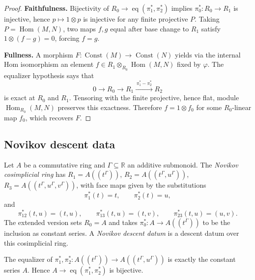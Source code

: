 \begin{proof}
  \leanok
  \textbf{Faithfulness.}  Bijectivity of $R_0 \to \operatorname{eq}(\pi_1^\ast,\pi_2^\ast)$
  implies $\pi_0^\ast \colon R_0 \to R_1$ is injective, hence
  $p \mapsto 1 \otimes p$ is injective for any finite projective $P$.
  Taking $P = \operatorname{Hom}(M, N)$, two maps $f,g$ equal after
  base change to $R_1$ satisfy $1 \otimes (f-g) = 0$, forcing $f=g$.

  \textbf{Fullness.}  A morphism $F \colon \operatorname{Const}(M) \to
  \operatorname{Const}(N)$ yields via the internal Hom isomorphism an
  element $f \in R_1 \otimes_{R_0} \operatorname{Hom}(M,N)$ fixed by
  $\varphi$.  The equalizer hypothesis says that
  \[
    0\longrightarrow R_0\longrightarrow R_1
      \xrightarrow{\,\pi_1^\ast-\pi_2^\ast\,}R_2
  \]
  is exact at $R_0$ and $R_1$.  Tensoring with the finite projective, hence
  flat, module $\operatorname{Hom}_{R_0}(M,N)$ preserves this exactness.
  Therefore $f=1\otimes f_0$ for some $R_0$-linear map $f_0$, which recovers
  $F$.
\end{proof}

\subsection{Novikov descent data}

\begin{definition}
  \label{def:novikov_descent_datum}
  \leanok
  Let $A$ be a commutative ring and $\Gamma \subseteq \mathbb{R}$ an additive
  submonoid.  The \emph{Novikov cosimplicial ring} has
  $R_1 = A((t^\Gamma))$,
  $R_2 = A((t^\Gamma, u^\Gamma))$,
  $R_3 = A((t^\Gamma, u^\Gamma, v^\Gamma))$,
  with face maps given by the substitutions
  \[
    \pi_1^\ast(t)=t,\qquad \pi_2^\ast(t)=u,
  \]
  and
  \[
    \pi_{12}^\ast(t,u)=(t,u),\qquad
    \pi_{13}^\ast(t,u)=(t,v),\qquad
    \pi_{23}^\ast(t,u)=(u,v).
  \]
  The extended version sets $R_0=A$ and takes
  $\pi_0^\ast\colon A\to A((t^\Gamma))$ to be the inclusion as constant
  series.
  A \emph{Novikov descent datum} is a descent datum over this cosimplicial ring.
\end{definition}

\begin{lemma}
  \label{lem:novikov_equalizer}
  \leanok
  The equalizer of
  $\pi_1^\ast, \pi_2^\ast \colon A((t^\Gamma)) \to A((t^\Gamma, u^\Gamma))$
  is exactly the constant series $A$.
  Hence $A \to \operatorname{eq}(\pi_1^\ast, \pi_2^\ast)$ is bijective.
\end{lemma}

